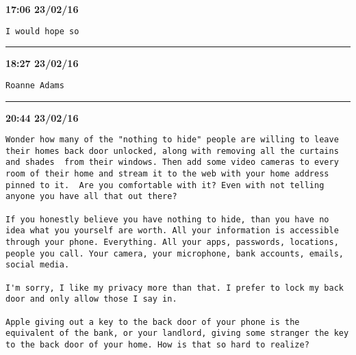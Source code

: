 \begin{adjustwidth}{0cm}{0cm}
\footnotesize \textbf{17:06 23/02/16}

\begin{lstlisting}[breaklines, breakatwhitespace, basicstyle=\small, frame=leftline]
I would hope so
\end{lstlisting}
\end{adjustwidth}

\hrule%

\begin{adjustwidth}{0cm}{0cm}
\footnotesize \textbf{18:27 23/02/16}

\begin{lstlisting}[breaklines, breakatwhitespace, basicstyle=\small, frame=leftline]
Roanne Adams
\end{lstlisting}
\end{adjustwidth}

\hrule%

\begin{adjustwidth}{0cm}{0cm}
\footnotesize \textbf{20:44 23/02/16}

\begin{lstlisting}[breaklines, breakatwhitespace, basicstyle=\small, frame=leftline]
Wonder how many of the "nothing to hide" people are willing to leave their homes back door unlocked, along with removing all the curtains and shades  from their windows. Then add some video cameras to every room of their home and stream it to the web with your home address pinned to it.  Are you comfortable with it? Even with not telling anyone you have all that out there? 

If you honestly believe you have nothing to hide, than you have no idea what you yourself are worth. All your information is accessible through your phone. Everything. All your apps, passwords, locations, people you call. Your camera, your microphone, bank accounts, emails, social media. 

I'm sorry, I like my privacy more than that. I prefer to lock my back door and only allow those I say in. 

Apple giving out a key to the back door of your phone is the equivalent of the bank, or your landlord, giving some stranger the key to the back door of your home. How is that so hard to realize?
\end{lstlisting}
\end{adjustwidth}

